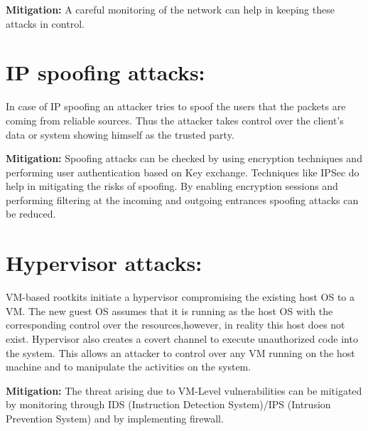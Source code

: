 \textbf{Mitigation:} A careful monitoring of the network can help in keeping these attacks in control. 
\section{IP spoofing attacks: }
In case of IP spoofing an attacker tries to spoof the users that the packets are coming from reliable sources. Thus the attacker takes control over the client’s data or system showing himself as the trusted party.

\textbf{Mitigation:} Spoofing attacks can be checked by using encryption techniques and performing user authentication based on Key exchange. Techniques like IPSec do help in mitigating the risks of spoofing. By enabling encryption sessions and performing filtering at the incoming and outgoing entrances spoofing attacks can be reduced.
\section{Hypervisor attacks: }
VM-based rootkits initiate a hypervisor compromising the existing host OS to a VM.
The new guest OS assumes that it is running as the host OS with the corresponding control over the resources,however, in reality this host does not exist. Hypervisor
also creates a covert channel to execute unauthorized code into the system. This allows an attacker to control over any VM running on the host machine and to manipulate
the activities on the system.

\textbf{Mitigation:} The threat arising due to VM-Level
vulnerabilities can be mitigated by monitoring through
IDS (Instruction Detection System)/IPS (Intrusion
Prevention System) and by implementing firewall.